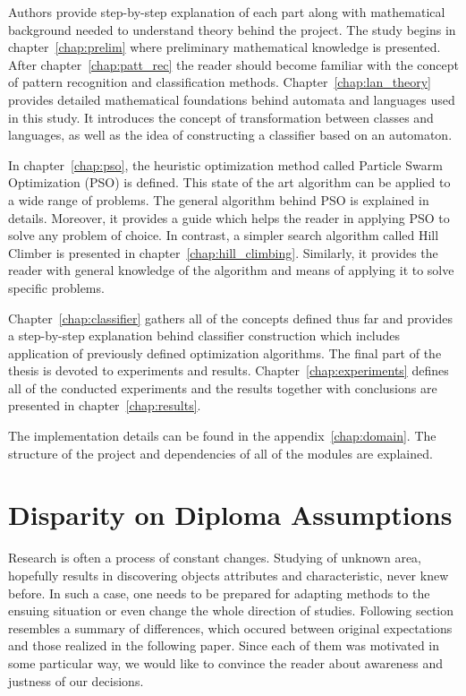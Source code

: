 \documentclass{mini}
\begin{document}
Authors provide step-by-step explanation of each part along with mathematical background needed to understand theory behind the project. The study begins in chapter~\ref{chap:prelim} where preliminary mathematical knowledge is presented.
After chapter~\ref{chap:patt_rec} the reader should become familiar with the concept of pattern recognition and classification methods. Chapter~\ref{chap:lan_theory} provides detailed mathematical foundations behind automata and languages used in this study. It introduces the concept of transformation between classes and languages, as well as the idea of constructing a classifier based on an automaton.

In chapter~\ref{chap:pso}, the heuristic optimization method called Particle Swarm Optimization (PSO) is defined. This state of the art algorithm can be applied to a wide range of problems. The
general algorithm behind PSO is explained in details. Moreover, it provides a guide which helps the reader in applying PSO to solve any problem of choice. In contrast, a simpler search algorithm called Hill Climber is presented in chapter~\ref{chap:hill_climbing}. Similarly, it provides the reader with general knowledge of the algorithm and means of applying it to solve specific problems.

Chapter~\ref{chap:classifier} gathers all of the concepts defined thus far and provides a step-by-step explanation behind classifier construction which includes application of previously defined optimization algorithms. The final part of the thesis is devoted to experiments and results.  Chapter~\ref{chap:experiments} defines all of the conducted experiments and the results together with conclusions are presented in chapter~\ref{chap:results}.

The implementation details can be found in the appendix~\ref{chap:domain}. The structure of the project and dependencies of all of the modules are explained.

\chapter*{Disparity on Diploma Assumptions }
Research is often a process of constant changes. Studying of unknown area, 
hopefully results in discovering objects attributes and characteristic, never knew before. 
In such a case, one needs to be prepared for adapting methods to the ensuing situation or 
even change the whole direction of studies. Following section resembles a summary of differences, 
which occured between original expectations and those realized in the following paper. Since each of 
them was motivated in some particular way, we would like to convince the reader 
about awareness and justness of our decisions.
\end{document}
